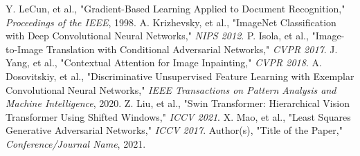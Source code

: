 \documentclass[sigconf]{acmart}
\begin{document}
\begin{thebibliography}{9}
     Y. LeCun, et al., "Gradient-Based Learning Applied to Document Recognition," \textit{Proceedings of the IEEE}, 1998.
     A. Krizhevsky, et al., "ImageNet Classification with Deep Convolutional Neural Networks," \textit{NIPS 2012}.
     P. Isola, et al., "Image-to-Image Translation with Conditional Adversarial Networks," \textit{CVPR 2017}.
     J. Yang, et al., "Contextual Attention for Image Inpainting," \textit{CVPR 2018}.
     A. Dosovitskiy, et al., "Discriminative Unsupervised Feature Learning with Exemplar Convolutional Neural Networks," \textit{IEEE Transactions on Pattern Analysis and Machine Intelligence}, 2020.
     Z. Liu, et al., "Swin Transformer: Hierarchical Vision Transformer Using Shifted Windows," \textit{ICCV 2021}.
     X. Mao, et al., "Least Squares Generative Adversarial Networks," \textit{ICCV 2017}.
     Author(s), "Title of the Paper," \textit{Conference/Journal Name}, 2021.
\end{thebibliography}
\end{document}
